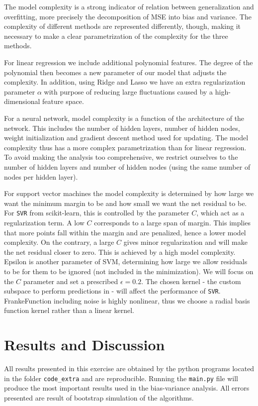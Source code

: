 \documentclass[a4paper]{article}
\def\code#1{\texttt{#1}}
\begin{document}
	The model complexity is a strong indicator of relation between generalization and overfitting, more precisely the decomposition of MSE into bias and variance. The complexity of different methods are represented differently, though, making it necessary to make a clear parametrization of the complexity for the three methods. 
	
	For linear regression we include additional polynomial features. The degree of the polynomial then becomes a new parameter of our model that adjusts the complexity. In addition, using Ridge and Lasso we have an extra regularization parameter $\alpha$ with purpose of reducing large fluctuations caused by a high-dimensional feature space.
	
	For a neural network, model complexity is a function of the architecture of the network. This includes the number of hidden layers, number of hidden nodes, weight initialization and gradient descent method used for updating. The model complexity thus has a more complex parametrization than for linear regression. To avoid making the analysis too comprehensive, we restrict ourselves to the number of hidden layers and number of hidden nodes (using the same number of nodes per hidden layer).

	For support vector machines the model complexity is determined by how large we want the minimum margin to be and how small we want the net residual to be. For \code{SVR} from scikit-learn, this is controlled by the parameter $C$, which act as a regularization term. A low $C$ corresponds to a large span of margin. This implies that more points fall within the margin and are penalized, hence a lower model complexity. On the contrary, a large $C$ gives minor regularization and will make the net residual closer to zero. This is achieved by a high model complexity. Epsilon is another parameter of SVM, determining how large we allow residuals to be for them to be ignored (not included in the minimization). We will focus on the $C$ parameter and set a prescribed $\epsilon = 0.2$. The chosen kernel - the custom subspace to perform predictions in - will affect the performance of \code{SVR}. FrankeFunction including noise is highly nonlinear, thus we choose a radial basis function kernel rather than a linear kernel.
	
	
	
	\section{Results and Discussion}
	All results presented in this exercise are obtained by the python programs located in the folder \code{code\_extra} and are reproducible. Running the \code{main.py} file will produce the most important results used in the bias-variance analysis. All errors presented are result of bootstrap simulation of the algorithms.
	
\end{document}
